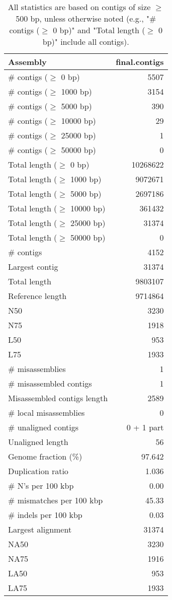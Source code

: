 \documentclass[12pt,a4paper]{article}
\begin{document}
\begin{table}[ht]
\begin{center}
\caption{All statistics are based on contigs of size $\geq$ 500 bp, unless otherwise noted (e.g., "\# contigs ($\geq$ 0 bp)" and "Total length ($\geq$ 0 bp)" include all contigs).}
\begin{tabular}{|l*{1}{|r}|}
\hline
Assembly & final.contigs \\ \hline
\# contigs ($\geq$ 0 bp) & 5507 \\ \hline
\# contigs ($\geq$ 1000 bp) & 3154 \\ \hline
\# contigs ($\geq$ 5000 bp) & 390 \\ \hline
\# contigs ($\geq$ 10000 bp) & 29 \\ \hline
\# contigs ($\geq$ 25000 bp) & 1 \\ \hline
\# contigs ($\geq$ 50000 bp) & 0 \\ \hline
Total length ($\geq$ 0 bp) & 10268622 \\ \hline
Total length ($\geq$ 1000 bp) & 9072671 \\ \hline
Total length ($\geq$ 5000 bp) & 2697186 \\ \hline
Total length ($\geq$ 10000 bp) & 361432 \\ \hline
Total length ($\geq$ 25000 bp) & 31374 \\ \hline
Total length ($\geq$ 50000 bp) & 0 \\ \hline
\# contigs & 4152 \\ \hline
Largest contig & 31374 \\ \hline
Total length & 9803107 \\ \hline
Reference length & 9714864 \\ \hline
N50 & 3230 \\ \hline
N75 & 1918 \\ \hline
L50 & 953 \\ \hline
L75 & 1933 \\ \hline
\# misassemblies & 1 \\ \hline
\# misassembled contigs & 1 \\ \hline
Misassembled contigs length & 2589 \\ \hline
\# local misassemblies & 0 \\ \hline
\# unaligned contigs & 0 + 1 part \\ \hline
Unaligned length & 56 \\ \hline
Genome fraction (\%) & 97.642 \\ \hline
Duplication ratio & 1.036 \\ \hline
\# N's per 100 kbp & 0.00 \\ \hline
\# mismatches per 100 kbp & 45.33 \\ \hline
\# indels per 100 kbp & 0.03 \\ \hline
Largest alignment & 31374 \\ \hline
NA50 & 3230 \\ \hline
NA75 & 1916 \\ \hline
LA50 & 953 \\ \hline
LA75 & 1933 \\ \hline
\end{tabular}
\end{center}
\end{table}
\end{document}
